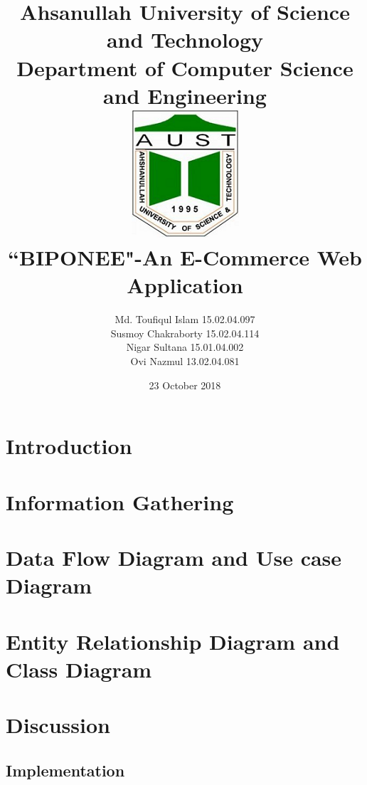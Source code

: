 \documentclass[10pt, twoside]{report}
\title{
	{Ahsanullah University of Science and Technology}\\
	{\large Department of Computer Science and Engineering}\\
	{\includegraphics{figures/AUST_logo2.png}
	}\\
	{\textbf{``BIPONEE"-An E-Commerce Web Application }
	}
	}
\author{Md. Toufiqul Islam 15.02.04.097\\
Susmoy Chakraborty  15.02.04.114\\
Nigar Sultana 15.01.04.002\\
Ovi Nazmul 13.02.04.081
}
\date{23 October 2018}
\theoremstyle{definition}
\begin{document}
\maketitle
{}




\tableofcontents
\listoffigures
\listoftables

\clearpage
{}

\chapter{Introduction}


\newpage
\chapter{Information Gathering}


\chapter{Data Flow Diagram and Use case Diagram}


\chapter{Entity Relationship Diagram and Class Diagram}


\chapter{Discussion}


\begin{appendices}
  \chapter{Implementation}
  
\end{appendices}



%
\end{document}

